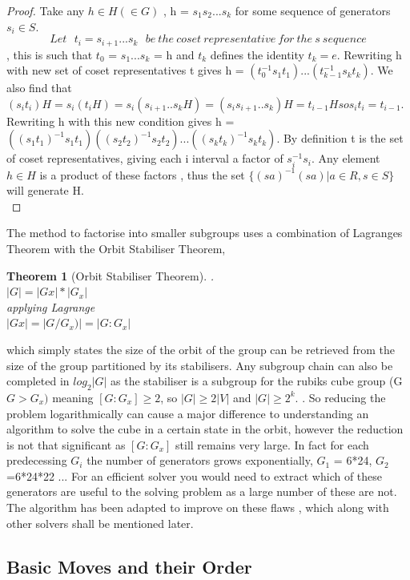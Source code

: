 \documentclass{article}
\newtheorem{theorem}{Theorem}[section]
\begin{document}
\begin{proof}
Take any $h\in H (\in G)$ , h = $s_{1}s_{2}...s_{k}$ for some sequence of generators $s_{i} \in S$.
\[Let\ \ \ t_{i} = s_{i+1}...s_{k}\ \ \ be\ the\ coset\ representative\ for\ the\ s\ sequence\] , this is such that $t_{0}$ = $s_{1}...s_{k}$ = h and $t_{k}$ defines the identity $t_{k} = e$.
Rewriting h with new set of coset representatives t gives h = $(t_{0}^{-1} s_{1} t_{1}) ...(t_{k-1}^{-1} s_{k} t_{k})$.
We also find that $(s_{i} t_{i})H = s_{i}(t_{i} H) = s_{i} ( s_{i+1}..s_{k} H) = (s_{i}s_{i+1}..s_{k})H = t_{i-1} H so s_{i} t_{i} = t_{i-1}.$
Rewriting h with this new condition gives h = $((s_{1} t_{1})^{-1} s_{1} t_{1})((s_{2} t_{2})^{-1} s_{2} t_{2}) ...((s_{k} t_{k})^{-1} s_{k} t_{k})$.
By definition t is the set of coset representatives, giving each i interval a factor of $s_{i}^{-1}s_{i}$. Any element $h \in H$ is a product of these factors , thus the set $\{(sa)^{-1} (sa) | a \in R, s \in S \}$ will generate H.\\
\end{proof}
The method to factorise into smaller subgroups uses a combination of Lagranges Theorem with the Orbit Stabiliser Theorem, 
\begin{theorem}[Orbit Stabiliser Theorem]
.\\
$|G|= |Gx|*|G_{x}|$\\
applying Lagrange\\
$|Gx|=|G/G_{x})|=|G:G_{x}|$
\end{theorem}
which simply states the size of the orbit of the group can be retrieved from the size of the group partitioned by its stabilisers. Any subgroup chain can also be completed in $log_{2}|G|$ as the stabiliser is a subgroup for the rubiks cube group (G $G>G_{x})$ meaning $[G:G_{x}]\geq 2$, so $|G|\geq2|V|$ and $|G|\geq 2^{k}.$
\cite{OrbStab}. So reducing the problem logarithmically can cause a major difference to understanding an algorithm to solve the cube in a certain state in the orbit, however the reduction is not that significant as $[G:G_{x}]$ still remains very large. In fact for each predecessing $G_{i}$ the number of generators grows exponentially, $G_{1}$ = 6*24, $G_{2}$=6*24*22 ... For an efficient solver you would need to extract which of these generators are useful to the solving problem as a large number of these are not. The algorithm has been adapted to improve on these flaws , which along with other solvers shall be mentioned later.

\subsection{Basic Moves and their Order}
\end{document}
